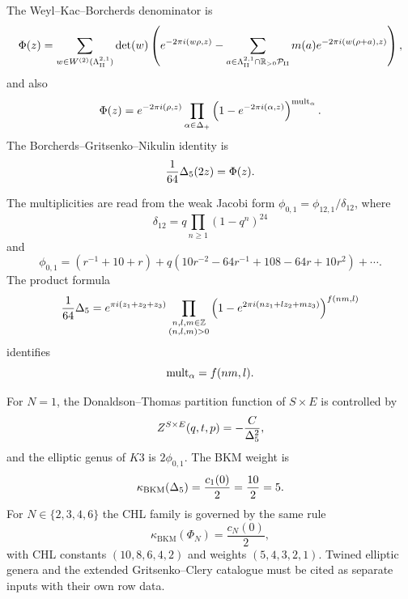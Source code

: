 The Weyl--Kac--Borcherds denominator is
\[
  \Phi(z)=
  \sum_{w\in W^{(2)}(\Lambda^{2,1}_{\mathrm{II}})}\det(w)
  \left(
  e^{-2\pi i(w\rho,z)}
  -
  \sum_{a\in\Lambda^{2,1}_{\mathrm{II}}\cap\mathbb{R}_{>0}\mathcal P_{\mathrm{II}}}
  m(a)e^{-2\pi i(w(\rho+a),z)}
  \right),
\]
and also
\[
  \Phi(z)=
  e^{-2\pi i(\rho,z)}
  \prod_{\alpha\in\Delta_+}
  \left(1-e^{-2\pi i(\alpha,z)}\right)^{\operatorname{mult}_\alpha}.
\]
The Borcherds--Gritsenko--Nikulin identity is
\[
  \frac{1}{64}\Delta_5(2z)=\Phi(z).
\]

The multiplicities are read from the weak Jacobi form
$\phi_{0,1}=\phi_{12,1}/\delta_{12}$, where
\[
  \delta_{12}=q\prod_{n\geq1}(1-q^n)^{24}
\]
and
\[
  \phi_{0,1}
  =(r^{-1}+10+r)
  +q(10r^{-2}-64r^{-1}+108-64r+10r^2)+\cdots .
\]
The product formula
\[
  \frac{1}{64}\Delta_5
  =e^{\pi i(z_1+z_2+z_3)}
  \prod_{\substack{n,l,m\in\mathbb{Z}\\(n,l,m)>0}}
  \left(1-e^{2\pi i(nz_1+lz_2+mz_3)}\right)^{f(nm,l)}
\]
identifies
\[
  \operatorname{mult}_\alpha=f(nm,l).
\]

For $N=1$, the Donaldson--Thomas partition function of $S\times E$ is
controlled by
\[
  Z^{S\times E}(q,t,p)=-\frac{C}{\Delta_5^2},
\]
and the elliptic genus of $K3$ is $2\phi_{0,1}$.  The BKM weight is
\[
  \kappa_{\mathrm{BKM}}(\Delta_5)=\frac{c_1(0)}2=\frac{10}{2}=5.
\]
For $N\in\{2,3,4,6\}$ the CHL family is governed by the same rule
\[
  \kappa_{\mathrm{BKM}}(\Phi_N)=\frac{c_N(0)}2,
\]
with CHL constants $(10,8,6,4,2)$ and weights $(5,4,3,2,1)$.
Twined elliptic genera and the extended Gritsenko--Clery catalogue
must be cited as separate inputs with their own row data.
